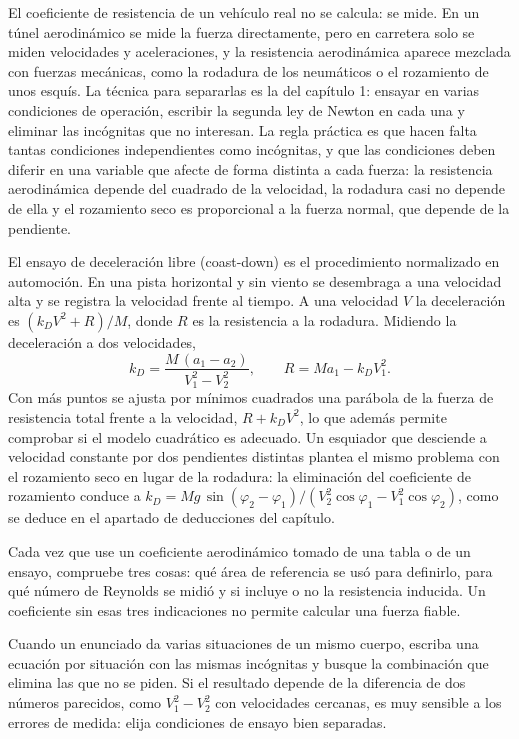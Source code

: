 \documentclass[10pt,openany]{book}
\begin{document}
El coeficiente de resistencia de un vehículo real no se calcula: se mide. En un túnel aerodinámico se mide la fuerza directamente, pero en carretera solo se miden velocidades y aceleraciones, y la resistencia aerodinámica aparece mezclada con fuerzas mecánicas, como la rodadura de los neumáticos o el rozamiento de unos esquís. La técnica para separarlas es la del capítulo 1: ensayar en varias condiciones de operación, escribir la segunda ley de Newton en cada una y eliminar las incógnitas que no interesan. La regla práctica es que hacen falta tantas condiciones independientes como incógnitas, y que las condiciones deben diferir en una variable que afecte de forma distinta a cada fuerza: la resistencia aerodinámica depende del cuadrado de la velocidad, la rodadura casi no depende de ella y el rozamiento seco es proporcional a la fuerza normal, que depende de la pendiente.

El ensayo de deceleración libre (coast-down) es el procedimiento normalizado en automoción. En una pista horizontal y sin viento se desembraga a una velocidad alta y se registra la velocidad frente al tiempo. A una velocidad \(V\) la deceleración es \((k_D V^{2} + R)/M\), donde \(R\) es la resistencia a la rodadura. Midiendo la deceleración a dos velocidades,
\begin{equation}
k_D = \frac{M\,(a_1 - a_2)}{V_1^{2} - V_2^{2}},\qquad R = M a_1 - k_D V_1^{2}. \label{eq:c07-deceleracion}
\end{equation}
Con más puntos se ajusta por mínimos cuadrados una parábola de la fuerza de resistencia total frente a la velocidad, \(R + k_D V^{2}\), lo que además permite comprobar si el modelo cuadrático es adecuado. Un esquiador que desciende a velocidad constante por dos pendientes distintas plantea el mismo problema con el rozamiento seco en lugar de la rodadura: la eliminación del coeficiente de rozamiento conduce a \(k_D = Mg\,\sin(\varphi_2 - \varphi_1)/(V_2^{2}\cos\varphi_1 - V_1^{2}\cos\varphi_2)\), como se deduce en el apartado de deducciones del capítulo.

\begin{tcolorbox}[title={Consejo}, studiumtip, breakable]

Cada vez que use un coeficiente aerodinámico tomado de una tabla o de un ensayo, compruebe tres cosas: qué área de referencia se usó para definirlo, para qué número de Reynolds se midió y si incluye o no la resistencia inducida. Un coeficiente sin esas tres indicaciones no permite calcular una fuerza fiable.

Cuando un enunciado da varias situaciones de un mismo cuerpo, escriba una ecuación por situación con las mismas incógnitas y busque la combinación que elimina las que no se piden. Si el resultado depende de la diferencia de dos números parecidos, como \(V_1^{2} - V_2^{2}\) con velocidades cercanas, es muy sensible a los errores de medida: elija condiciones de ensayo bien separadas.
\end{tcolorbox}
\end{document}
